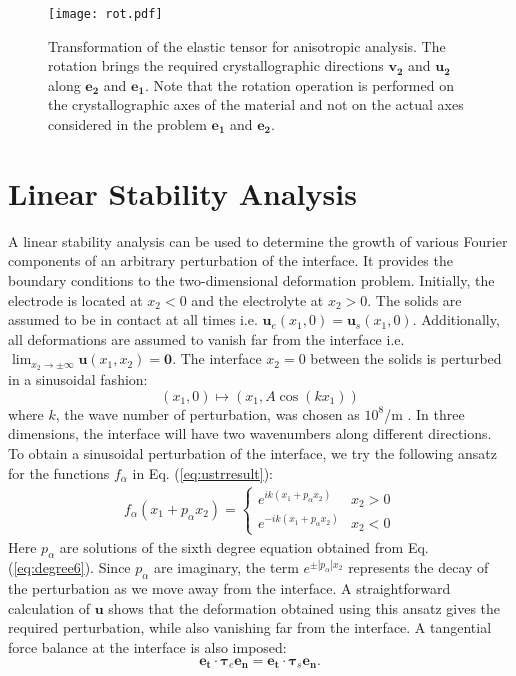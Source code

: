 \documentclass[%
reprint,
 amsmath,amssymb,
 aps,
 prb,
]{revtex4-1}
\newcommand*{\rtten}[1]{\mathbf{\boldsymbol{#1}}}
\newcommand*{\rtvec}[1]{\mathbf{#1}}
\begin{document}
\begin{figure}[htbp]
{\texttt{[image: rot.pdf]}}
\caption{\label{fig:Qtrans} Transformation of the elastic tensor for anisotropic analysis. The rotation brings the required crystallographic directions $\rtvec{v_2}$ and $\rtvec{u_2}$ along $\rtvec{e_2}$ and $\rtvec{e_1}$. Note that the rotation operation is performed on the crystallographic axes of the material and not on the actual axes considered in the problem $\rtvec{e_1}$ and $\rtvec{e_2}$.}
\end{figure}

\section{Linear Stability Analysis}\label{sec:lsa}
A linear stability analysis can be used to determine the growth of various Fourier components of an arbitrary perturbation of the interface. It provides the boundary conditions to the two-dimensional deformation problem. Initially, the electrode is located at $x_2<0$ and the electrolyte at $x_2>0$. The solids are assumed to be in contact at all times i.e. $\rtvec{u}_e(x_1,0)=\rtvec{u}_s(x_1,0)$. Additionally, all deformations are assumed to vanish far from the interface i.e. $\lim_{x_2\to \pm \infty}\rtvec{u}(x_1,x_2)=\rtvec{0}$. The interface $x_2=0$ between the solids is perturbed in a sinusoidal fashion:
\begin{equation}
(x_1,0)\mapsto (x_1, A\cos(kx_1))
\end{equation}
where $k$, the wave number of perturbation, was chosen as $10^8$/m \cite{Monroe2005Impact, ahmad2017stability}. In three dimensions, the interface will have two wavenumbers along different directions. To obtain a sinusoidal perturbation of the interface, we try the following ansatz for the functions $f_\alpha$ in Eq. (\ref{eq:ustrresult}):
\begin{eqnarray}\label{eq:flin}
f_{\alpha}(x_1+p_\alpha x_2)=\begin{cases} e^{ik(x_1+p_\alpha x_2)} &  x_2
>0\\
 e^{-ik(x_1+p_\alpha x_2)} &  x_2
<0
\end{cases}\end{eqnarray}
Here $p_\alpha$ are solutions of the sixth degree equation obtained from Eq. (\ref{eq:degree6}). Since $p_\alpha$ are imaginary, the term $e^{\pm |p_\alpha|x_2}$ represents the decay of the perturbation as we move away from the interface. A straightforward calculation of $\rtvec{u}$ shows that the deformation obtained using this ansatz gives the required perturbation, while also vanishing far from the interface. A tangential force balance at the interface is also imposed:
\begin{equation}
\rtvec{e_t} \cdot \rtten{\tau}_{e}\rtvec{e_n} = \rtvec{e_t}\cdot \rtten{\tau}_{s}\rtvec{e_n}.
\end{equation}
\end{document}
